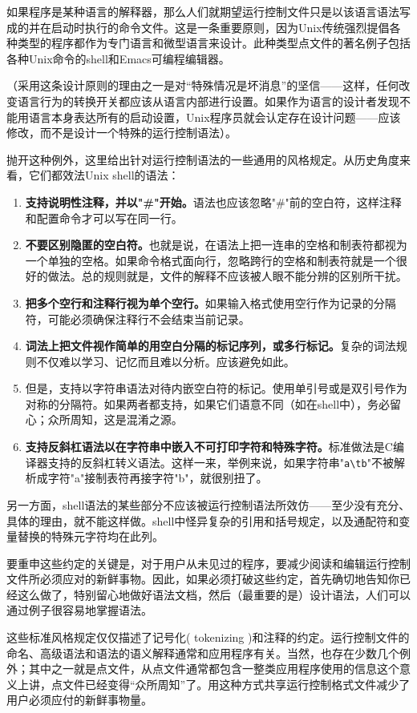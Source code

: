 \documentclass[12pt,oneside]{book}
\begin{document}
\begin{common-format}
如果程序是某种语言的解释器，那么人们就期望运行控制文件只是以该语言语法写成的并在启动时执行的命令文件。这是一条重要原则，因为Unix传统强烈提倡各种类型的程序都作为专门语言和微型语言来设计。此种类型点文件的著名例子包括各种Unix命令的shell和Emacs可编程编辑器。

（采用这条设计原则的理由之一是对“特殊情况是坏消息”的坚信——这样，任何改变语言行为的转换开关都应该从语言内部进行设置。如果作为语言的设计者发现不能用语言本身表达所有的启动设置，Unix程序员就会认定存在设计问题——应该修改，而不是设计一个特殊的运行控制语法）。

抛开这种例外，这里给出针对运行控制语法的一些通用的风格规定。从历史角度来看，它们都效法Unix shell的语法：
\begin{enumerate}
\item \textbf{支持说明性注释，并以"\#{}"开始。}语法也应该忽略"\#{}"前的空白符，这样注释和配置命令才可以写在同一行。
\item \textbf{不要区别隐匿的空白符。}也就是说，在语法上把一连串的空格和制表符都视为一个单独的空格。如果命令格式面向行，忽略跨行的空格和制表符就是一个很好的做法。总的规则就是，文件的解释不应该被人眼不能分辨的区别所干扰。
\item \textbf{把多个空行和注释行视为单个空行。}如果输入格式使用空行作为记录的分隔符，可能必须确保注释行不会结束当前记录。
\item \textbf{词法上把文件视作简单的用空白分隔的标记序列，或多行标记。}复杂的词法规则不仅难以学习、记忆而且难以分析。应该避免如此。
\item 但是，支持以字符串语法对待内嵌空白符的标记。使用单引号或是双引号作为对称的分隔符。如果两者都支持，如果它们语意不同（如在shell中），务必留心；众所周知，这是混淆之源。
\item \textbf{支持反斜杠语法以在字符串中嵌入不可打印字符和特殊字符。}标准做法是C编译器支持的反斜杠转义语法。这样一来，举例来说，如果字符串"\verb+a\tb+"不被解析成字符"a"接制表符再接字符"b"，就很别扭了。
\end{enumerate}

另一方面，shell语法的某些部分不应该被运行控制语法所效仿——至少没有充分、具体的理由，就不能这样做。shell中怪异复杂的引用和括号规定，以及通配符和变量替换的特殊元字符均在此列。

要重申这些约定的关键是，对于用户从未见过的程序，要减少阅读和编辑运行控制文件所必须应对的新鲜事物。因此，如果必须打破这些约定，首先确切地告知你已经这么做了，特别留心地做好语法文档，然后（最重要的是）设计语法，人们可以通过例子很容易地掌握语法。

这些标准风格规定仅仅描述了记号化( tokenizing )和注释的约定。运行控制文件的命名、高级语法和语法的语义解释通常和应用程序有关。当然，也存在少数几个例外；其中之一就是点文件，从点文件通常都包含一整类应用程序使用的信息这个意义上讲，点文件已经变得“众所周知”了。用这种方式共享运行控制格式文件减少了用户必须应付的新鲜事物量。


\end{common-format}
\end{document}
